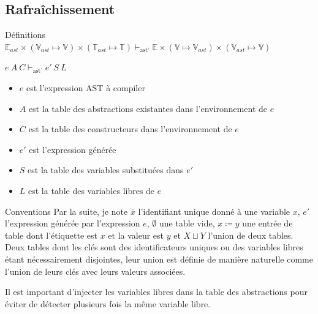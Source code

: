 \documentclass{beamer}
\begin{document}
\subsection{Rafraîchissement}

\begin{frame}{Définitions}
    $\mathbb{E}_{ast} \times \left( \mathbb{V}_{ast} \mapsto \mathbb{V} \right) \times \left( \mathbb{T}_{ast} \mapsto \mathbb{T} \right) \vdash_{\text{ast'}} \mathbb{E} \times \left( \mathbb{V} \mapsto \mathbb{V}_{ast} \right) \times \left( \mathbb{V}_{ast} \mapsto \mathbb{V} \right)$

    $e ~ A ~ C \vdash_{\text{ast'}} e' ~ S ~ L$
    \begin{itemize}
        \item $e$ est l'expression AST à compiler
        \item $A$ est la table des abstractions existantes dans l'environnement de $e$
        \item $C$ est la table des constructeurs dans l'environnement de $e$
        \item $e'$ est l'expression générée
        \item $S$ est la table des variables substituées dans $e'$
        \item $L$ est la table des variables libres de $e$
    \end{itemize}
\end{frame}

\begin{frame}{Conventions}
    Par la suite, je note $\overline{x}$ l'identifiant unique donné à une variable $x$, $e'$ l'expression générée par l'expression $e$, $\emptyset$ une table vide, $x \coloneqq y$ une entrée de table dont l'étiquette est $x$ et la valeur est $y$ et $X \sqcup Y$ l'union de deux tables. Deux tables dont les clés sont des identificateurs uniques ou des variables libres étant nécessairement disjointes, leur union est définie de manière naturelle comme l'union de leurs clés avec leurs valeurs associées.

    Il est important d'injecter les variables libres dans la table des abstractions pour éviter de détecter plusieurs fois la même variable libre.
\end{frame}
\end{document}
